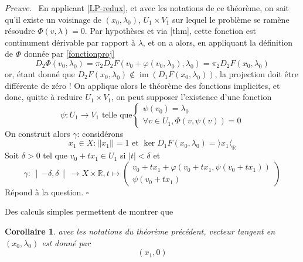 \documentclass[a4paper,12pt,oneside,titlepage]{article}
\newcommand{\R}[0]{\mathbb{R}}
\newcommand{\im}[0]{\operatorname{im}}
\theoremstyle{definition}
\theoremstyle{plain}
\newtheorem{corollaire}[definition]{Corollaire}
\newenvironment{preuve}
{\par\noindent\textit{Preuve.}\ }
{\hfill$\square$\par}
\begin{document}
\begin{preuve}
    En applicant \ref{LP-redux}, et avec les notations de ce théorème, on sait qu'il existe un voisinage de $(x_0,\lambda_0)$, $U_1\times V_1$ sur lequel le problème se ramène résoudre $\Phi(v,\lambda)=0$.
    Par hypothèses et via [thm], cette fonction est continument dérivable par rapport à $\lambda$, et on a alors, en appliquant la définition de $\Phi$ donnée par \ref{fonctionproj} 
    \begin{equation*}
        D_2\Phi(v_0,\lambda_0)=\pi_2 D_2 F(v_0+\varphi(v_0,\lambda_0),\lambda_0)=\pi_2 D_2 F(x_0,\lambda_0)
    \end{equation*}
    or, étant donné que $D_2F(x_0,\lambda_0)\notin \im(D_1F(x_0,\lambda_0))$, la projection doit être différente de zéro ! On applique alors le théorème des fonctions implicites, et donc, quitte à reduire $U_1\times V_1$, on peut supposer l'existence d'une fonction 
    \begin{equation*}
        \psi : U_1\rightarrow V_1\text{ telle que} 
        \begin{cases}
            \psi(v_0)=\lambda_0
            \\ \forall v\in U_1, \Phi(v,\psi(v))=0 
        \end{cases}
    \end{equation*}
    On construit alors $\gamma$: considérons
    \begin{equation*}
        x_1\in X : ||x_1||=1 \text{ et } \ker D_1 F(x_0,\lambda_0)=\rangle x_1\langle_{\R}
    \end{equation*}
    Soit $\delta>0$ tel que $v_0+t x_1\in U_1$ si $|t|<\delta $ 
    et 
    \begin{equation*}
        \gamma : \left] -\delta,\delta\right[\rightarrow X\times \R ,t\mapsto
                    \begin{pmatrix}
                    v_0+t x_1+\varphi(v_0+tx_1,\psi(v_0+tx_1)) \\
                    \psi(v_0+tx_1)
                    \end{pmatrix}
    \end{equation*}
    Répond à la question.
\end{preuve}
Des calculs simples  permettent de montrer que 
\begin{corollaire}
    avec les notations du théorème précédent, vecteur tangent en $(x_0,\lambda_0)$ est donné par
    \begin{equation*}
        (x_1,0)
    \end{equation*}
\end{corollaire}
\end{document}
